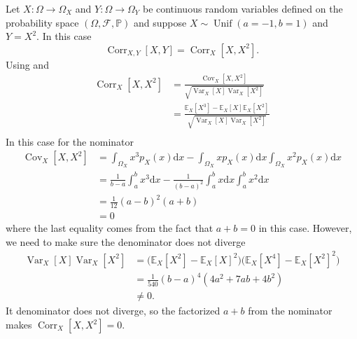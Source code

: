 \begin{example}
	Let $X\colon\Omega \to \Omega_X$ and $Y\colon\Omega\to \Omega_Y$ be continuous random variables defined on the probability space $(\Omega,\mathcal{F},\mathbb{P})$ and suppose $X\sim \operatorname{Unif}(a=-1, b=1)$ and $Y=X^2$. In this case 
	\begin{equation}
		\operatorname{Corr}_{X,Y}[X,Y] = \operatorname{Corr}_{X}[X,X^2].
	\end{equation}
	Using  and 
	\begin{equation}
		\begin{split}
			\operatorname{Corr}_{X}[X,X^2] & = \frac{\operatorname{Cov}_{X}[X,X^2]}{\sqrt{\operatorname{Var}_X[X]\operatorname{Var}_X[X^2]}}\\
			& = \frac{\mathbb{E}_{X}[X^3]-\mathbb{E}_X[X]\mathbb{E}_X[X^2]}{\sqrt{\operatorname{Var}_X[X]\operatorname{Var}_X[X^2]}}\\
		\end{split}
	\end{equation}
	In this case for the nominator
	\begin{equation}
		\begin{split}
			\operatorname{Cov}_{X}[X,X^2] &= \int_{\Omega_X} x^3 p_X(x) \mathrm{d}x-\int_{\Omega_X} xp_X(x) \mathrm{d}x\int_{\Omega_X} x^2p_X(x) \mathrm{d}x\\
			&= \frac{1}{b-a}\int_{a}^{b}x^3\mathrm{d}x-\frac{1}{(b-a)^2}\int_{a}^{b} x \mathrm{d}x\int_{a}^{b} x^2 \mathrm{d}x\\
			&= \frac{1}{12}(a-b)^2(a+b)\\
			&=0
		\end{split}
	\end{equation}
	where the last equality comes from the fact that $a+b = 0$ in this case. However, we need to make sure the denominator does not diverge
	\begin{equation}
		\begin{split}
			\operatorname{Var}_X[X]\operatorname{Var}_X[X^2] & =\big(\mathbb{E}_X[X^2]-\mathbb{E}_X[X]^2\big) \big(\mathbb{E}_X[X^4]-\mathbb{E}_X[X^2]^2\big)\\
			& = \frac{1}{540}(b-a)^4(4a^2+7ab+4b^2)\\
			&\neq 0.
		\end{split}
	\end{equation}
	It denominator does not diverge, so the factorized $a+b$ from the nominator makes $\operatorname{Corr}_{X}[X,X^2]=0$.
\end{example}

